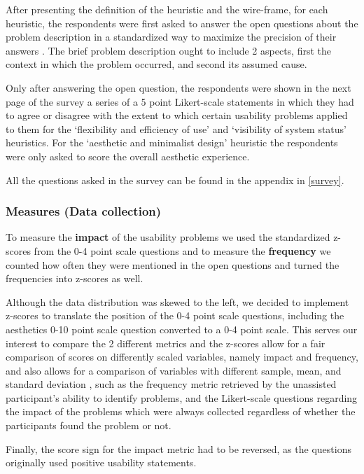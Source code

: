 \documentclass{article}
\begin{document}
After presenting the definition of the heuristic and the wire-frame, for each heuristic, the respondents were first asked to answer
the open questions about the problem description in a standardized way to maximize the precision of their answers \parencite{Nielsen1994}.
The brief problem description ought to include 2 aspects, first the context in which the problem occurred, and second its assumed cause.

Only after answering the open question, the respondents were shown in the next page of the survey a series of a 5 point Likert-scale
statements in which they had to agree or disagree with the extent to which certain usability problems applied to them for the
`flexibility and efficiency of use' and `visibility of system status' heuristics. For the `aesthetic and minimalist design' heuristic
the respondents were only asked to score the overall aesthetic experience.

All the questions asked in the survey can be found in the appendix in \ref{survey}.

\subsubsection{Measures (Data collection)}

To measure the \textbf{impact} of the usability problems we used the standardized z-scores from the 0-4 point scale questions
and to measure the \textbf{frequency} we counted how often they were mentioned in the open questions and turned
the frequencies into z-scores as well.

Although the data distribution was skewed to the left, we decided to implement z-scores to translate the position of the 0-4 point
scale questions, including the aesthetics 0-10 point scale question converted to a 0-4 point scale. This serves our interest to compare
the 2 different metrics and the z-scores allow for a fair comparison of scores on differently scaled variables,
namely impact and frequency, and also allows for a comparison of variables with different sample, mean, and standard deviation
\parencite{zscore}, such as the frequency metric retrieved
by the unassisted participant's ability to identify problems, and the Likert-scale questions regarding the impact of the problems
which were always collected regardless of whether the participants found the problem or not.

Finally, the score sign for the impact metric had to be reversed, as the questions originally used positive usability statements.
\end{document}
